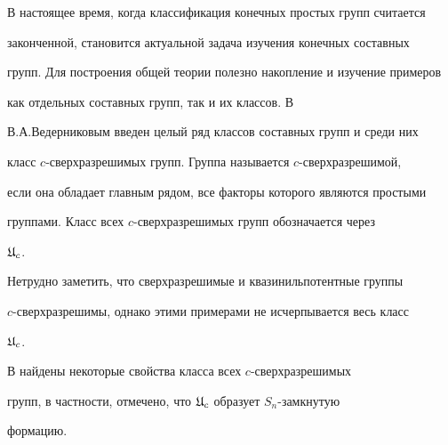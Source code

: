 \date{}







\pagestyle{plain} %













\maketitle










В настоящее время, когда классификация конечных простых групп считается


законченной, становится актуальной задача изучения конечных составных


групп. Для построения общей теории полезно накопление и изучение примеров


как отдельных составных групп, так и их классов. В \cite{Ved}


В.А.Ведерниковым введен целый ряд классов составных групп и среди них


класс $c$-сверхразрешимых групп. Группа называется $c$-сверхразрешимой,


если она обладает главным рядом, все факторы которого являются простыми


группами. Класс всех $c$-сверхразрешимых групп обозначается через


$\frak U_c$.


Нетрудно заметить, что сверхразрешимые и квазинильпотентные группы


$c$-сверхразрешимы, однако этими примерами не исчерпывается весь класс


$\frak U_c$.


В \cite{Ved} найдены некоторые свойства класса всех $c$-сверхразрешимых


групп, в частности, отмечено, что $\frak U_c$ образует $S_n$-замкнутую


формацию.





